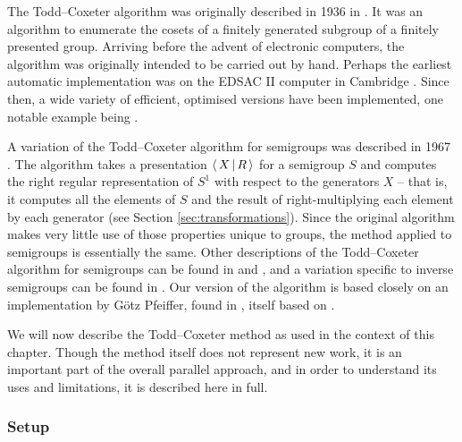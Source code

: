 The Todd--Coxeter algorithm was originally described in 1936 in
\cite{todd_coxeter_1936}.  It was an algorithm to enumerate the cosets of a
finitely generated subgroup of a finitely presented group.  Arriving before the
advent of electronic computers, the algorithm was originally intended to be
carried out by hand.  Perhaps the earliest automatic implementation was on the
EDSAC II computer in Cambridge \cite{leech_1963}.  Since then, a wide variety of
efficient, optimised versions have been implemented, one notable example being
\ACE{} \cite{ace}.

A variation of the Todd--Coxeter algorithm for semigroups was described in 1967
\cite{neumann_1967}.  The algorithm takes a presentation $\left\langle \, X \, \middle| \, R \, \right\rangle$
for a semigroup $S$ and computes the right regular representation of $S^1$ with
respect to the generators $X$ -- that is, it computes all the elements of $S$ and
the result of right-multiplying each element by each generator (see Section
\ref{sec:transformations}).  Since the
original algorithm makes very little use of those properties unique to groups,
the method applied to semigroups is essentially the same.  Other descriptions of
the Todd--Coxeter algorithm for semigroups can be found in \cite[Chapter 12]{ruskuc_thesis} and
\cite[Chapter 1.2]{walker_thesis}, and a variation specific to inverse
semigroups can be found in \cite{cutting_thesis}.  Our version of the algorithm
is based closely on an implementation by G\"otz Pfeiffer, found in
\cite[\texttt{lib/tcsemi.gi}]{gap}, itself based on \cite{walker_thesis}.

We will now describe the Todd--Coxeter method as used in the context of this
chapter.  Though the method itself does not represent new work, it is an
important part of the overall parallel approach, and in order to understand its
uses and limitations, it is described here in full.

\subsubsection{Setup}

